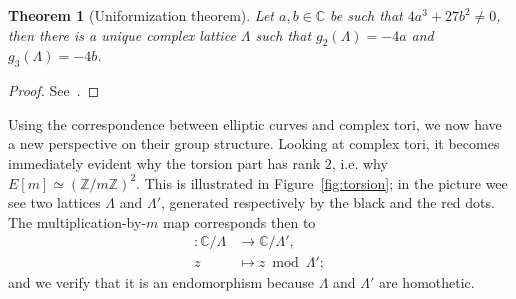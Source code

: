 \documentclass[10pt]{article}
\theoremstyle{plain}
\newtheorem{theorem}{Theorem}
\theoremstyle{definition}
\begin{document}
\begin{theorem}[Uniformization theorem]
  Let $a,b∈ℂ$ be such that $4a^3+27b^2≠0$, then there is a unique
  complex lattice $Λ$ such that $g_2(Λ) = -4a$ and $g_3(Λ) = -4b$.
\end{theorem}
\begin{proof}
  See~\cite[I, Coro.~4.3]{silverman:advanced}.
\end{proof}

Using the correspondence between elliptic curves and complex tori, we
now have a new perspective on their group structure. %
Looking at complex tori, it becomes immediately evident why the
torsion part has rank $2$, i.e. why $E[m]≃(ℤ/mℤ)^2$. %
This is illustrated in Figure~\ref{fig:torsion}; in the picture wee
see two lattices $Λ$ and $Λ'$, generated respectively by the black and
the red dots. %
The multiplication-by-$m$ map corresponds then to
\begin{align*}
  [m] : ℂ/Λ &\to ℂ/Λ',\\
  z &\mapsto z \bmod Λ';
\end{align*}
and we verify that it is an endomorphism because $Λ$ and $Λ'$ are
homothetic.
\end{document}

